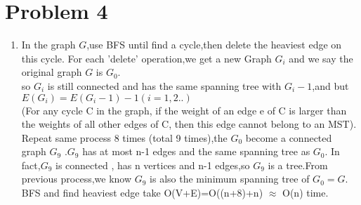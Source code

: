 \documentclass[paper=a4, fontsize=11pt]{scrartcl} %
\numberwithin{equation}{section} %
\numberwithin{figure}{section} %
\numberwithin{table}{section} %
\begin{document}
\section*{Problem 4}
\begin{enumerate}[label={4.\arabic*}]
  \item 
In the graph ${G }$,use BFS until find a cycle,then delete the heaviest edge on this cycle.
For each 'delete' operation,we get a new Graph ${G_i}$ and we say the original graph ${G}$ is ${G_0}$.\\
so ${G_i }$ is still connected and has the same spanning tree with ${G_i -1}$,and   but ${E(G_i)=E(G_i-1)-1 (i=1,2..)}$ \\(For any cycle C in the graph, if the weight of an edge e of C is larger than the weights of all other edges of C, then this edge cannot belong to an MST).
Repeat same process 8 times (total 9 times),the ${G_0}$ become a connected graph ${G_9}$ .${G_9}$ has at most  n-1 edges and the same spanning tree as ${G_0}$.
In fact,${G_9}$ is connected , has n vertices and n-1 edges,so ${G_9}$ is a tree.From previous process,we know ${G_9}$ is also the minimum spanning tree of ${G_0=G}$.\\
BFS and find heaviest edge take O(V+E)=O((n+8)+n) $\approx$ O(n) time. 

\end{enumerate}
\end{document}
